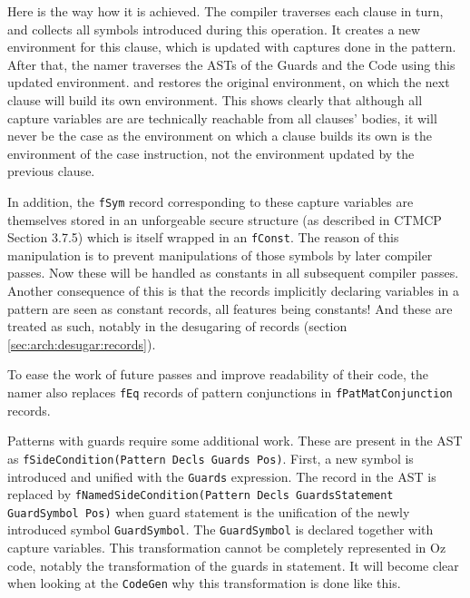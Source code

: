 \documentclass[a4paper]{memoir}
\begin{document}
Here is the way how it is achieved. The compiler traverses each clause in turn,
and collects all symbols introduced during this operation. It creates a new
environment for this clause, which is updated with captures done in the
pattern. After that, the namer traverses the ASTs of the Guards and the Code
using this updated environment. and restores the original environment, on which
the next clause will build its own environment. This shows clearly that
although all capture variables are are technically reachable from all clauses'
bodies, it will never be the case as the environment on which a clause builds
its own is the environment of the case instruction, not the environment updated
by the previous clause. 

In addition, the \lstinline!fSym! record corresponding to these capture
variables are themselves stored in an unforgeable secure structure (as
described in CTMCP Section 3.7.5) which is itself wrapped in an
\lstinline!fConst!. The reason of this manipulation is to prevent manipulations
of those symbols by later compiler passes. Now these will be handled as
constants in all subsequent compiler passes. Another consequence of this is
that the records implicitly declaring variables in a pattern are seen as
constant records, all features being constants! And these are treated as such,
notably in the desugaring of records (section \ref{sec:arch:desugar:records}).

To ease the work of future passes and improve readability of their code, the
namer also replaces \lstinline!fEq! records of pattern conjunctions in
\lstinline!fPatMatConjunction! records.

Patterns with guards require some additional work. These are present in the AST
as \lstinline!fSideCondition(Pattern Decls Guards Pos)!. First, a new symbol is
introduced and unified with the \lstinline!Guards! expression. The record in the
AST is replaced by \lstinline!fNamedSideCondition(Pattern Decls GuardsStatement GuardSymbol Pos)! when guard statement is the unification of the newly
introduced symbol \lstinline!GuardSymbol!. The \lstinline!GuardSymbol! is
declared together with capture variables. 
This transformation cannot be completely represented in Oz code, notably the
transformation of the guards in statement. It will become clear when looking at
the \lstinline!CodeGen! why this transformation is done like this.
\end{document}
